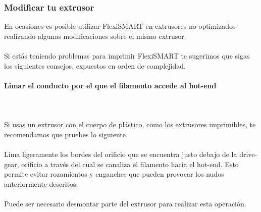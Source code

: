 \documentclass[11pt,a4paper]{article}
\begin{document}
		\subsubsection{Modificar tu extrusor}
En ocasiones es posible utilizar FlexiSMART en extrusores no optimizados realizando algunas modificaciones sobre el mismo extrusor.
\\\\
Si estás teniendo problemas para imprimir FlexiSMART te sugerimos que sigas los siguientes consejos, expuestos en orden de complejidad.
			\paragraph{Limar el conducto por el que el filamento accede al hot-end}\mbox{}\\\\
Si usas un extrusor con el cuerpo de plástico, como los extrusores imprimibles, te recomendamos que pruebes lo siguiente. 
\\\\
Lima ligeramente los bordes del orificio que se encuentra justo debajo de la drive-gear, orificio a través del cual se canaliza el filamento hacia el hot-end. Esto permite evitar rozamientos y enganches que pueden provocar los nudos anteriormente descritos. 
\\\\
Puede ser necesario desmontar parte del extrusor para realizar esta operación.
\end{document}
